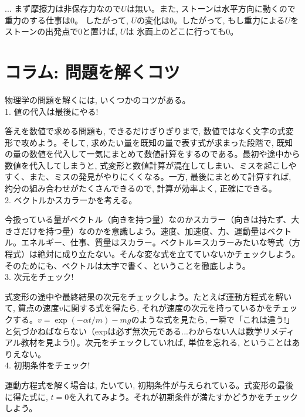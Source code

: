 \begin{faq}{\small{} ... 
まず摩擦力は非保存力なので$U$は無い。また, ストーンは水平方向に動くので重力のする仕事は0。
したがって, $U$の変化は0。したがって, もし重力による$U$をストーンの出発点で0と置けば, $U$は
氷面上のどこに行っても0。}\end{faq}\mv


\section*{コラム: 問題を解くコツ}

物理学の問題を解くには, いくつかのコツがある。\\

1. 値の代入は最後にやる!

答えを数値で求める問題も, できるだけぎりぎりまで, 数値ではなく文字の式変形で攻めよう。そして, 求めたい量を既知の量で表す式が求まった段階で, 既知の量の数値を代入して一気にまとめて数値計算をするのである。最初や途中から数値を代入してしまうと, 式変形と数値計算が混在してしまい、ミスを起こしやすく、また、ミスの発見がやりにくくなる。一方, 最後にまとめて計算すれば, 約分の組み合わせがたくさんできるので, 計算が効率よく, 正確にできる。\\

2. ベクトルかスカラーかを考える。

今扱っている量がベクトル（向きを持つ量）なのかスカラー（向きは持たず、大きさだけを持つ量）なのかを意識しよう。速度、加速度、力、運動量はベクトル。エネルギー、仕事、質量はスカラー。ベクトル＝スカラーみたいな等式（方程式）は絶対に成り立たない。そんな変な式を立てていないかチェックしよう。そのためにも、ベクトルは太字で書く、ということを徹底しよう。\\

3. 次元をチェック!

式変形の途中や最終結果の次元をチェックしよう。たとえば運動方程式を解いて, 質点の速度$v$に関する式を得たら, それが速度の次元を持っているかをチェックする。$v=\exp(-\alpha t/m)-mg$のような式を見たら, 一瞬で「これは違う!」と気づかねばならない（expは必ず無次元である...わからない人は数学リメディアル教材を見よう!）。次元をチェックしていれば, 単位を忘れる, ということはありえない。\\

4. 初期条件をチェック!

運動方程式を解く場合は, たいてい, 初期条件が与えられている。式変形の最後に得た式に, $t=0$を入れてみよう。それが初期条件が満たすかどうかをチェックしよう。\\

